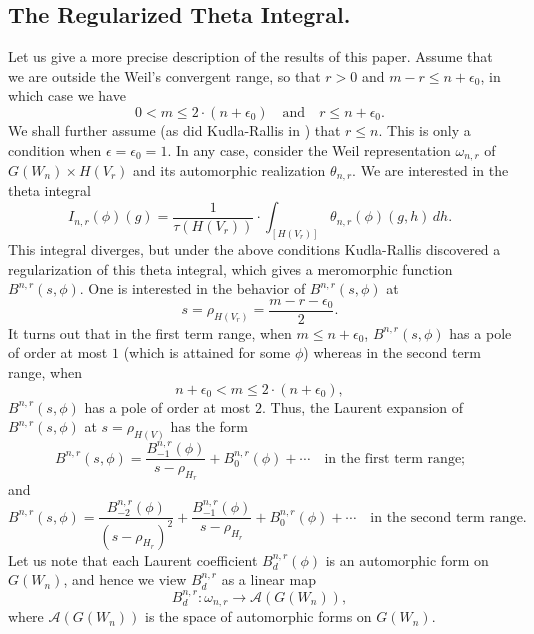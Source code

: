 \documentclass[10pt]{amsart}
\theoremstyle{plain}
\numberwithin{equation}{section}
\begin{document}
\subsection{\bf The Regularized Theta Integral.}
 Let us  give a more precise description of the results of this paper. 
 Assume that we are outside the Weil's convergent range, so that $r >
 0$ and $m-r \leq  n+ \epsilon_0$, in which case we have
 \[  
0 < m  \leq 2 \cdot (n+ \epsilon_0) \quad \text{and} \quad r \leq n+
\epsilon_0. 
\]
 We shall further assume (as did Kudla-Rallis in \cite{KR5}) that $r \leq
 n$. This is only a condition when $\epsilon = \epsilon_ 0 =1$.
In any case, consider the Weil representation $\omega_{n,r}$ of
$G(W_n)\times H(V_r)$ and its automorphic realization
$\theta_{n,r}$. We are interested in the theta integral 
 \[  
I_{n,r}(\phi)(g)    =\frac{1}{\tau(H(V_r))} \cdot  \int_{[H(V_r)]} \theta_{n,r}(\phi)(g,h) \, dh. 
\]
This integral diverges, but under the above conditions
 Kudla-Rallis \cite{KR5} discovered a regularization of this theta
 integral, which gives a meromorphic function $B^{n,r}(s,\phi)$. One
 is interested in the behavior of $B^{n,r}(s,\phi)$ at 
 \[  
s = \rho_{H(V_r)} = \frac{m - r -\epsilon_0}{2}.  
\]
 It turns out that in the first term range, when $m \leq n +
 \epsilon_0$,  $B^{n,r}(s,\phi)$ has a pole of order at most $1$
 (which is attained for some $\phi$) whereas in the second term range,
 when 
 \[ 
n+\epsilon_0 < m \leq 2 \cdot (n+\epsilon_0), 
\]
 $B^{n,r}(s,\phi)$ has a pole of order at most $2$.  Thus, the Laurent
 expansion of $B^{n,r}(s,\phi)$ at $s = \rho_{H(V)}$ has the form
 \[  
B^{n,r}(s, \phi)  =  \frac{B^{n,r}_{-1}(\phi)}{s-\rho_{H_r}} +
B^{n,r}_0(\phi)+\cdots  \quad \text{in the first term range;} 
\]
 and
\[
 B^{n,r}(s, \phi)  =  \frac{B^{n,r}_{-2}(\phi)}{(s-\rho_{H_r})^2} +
   \frac{B^{n,r}_{-1}(\phi)}{s-\rho_{H_r}} +  B^{n,r}_0(\phi)+\cdots
 \quad \text{in the second term range.}  
\]
Let us note that each Laurent coefficient $B_d^{n,r}(\phi)$ is an
automorphic form on $G(W_n)$, and hence we view $B_d^{n,r}$ as a
linear map
\[
B_d^{n,r}:\omega_{n,r}\rightarrow {\mathcal{A}}(G(W_n)),
\]
where ${\mathcal{A}}(G(W_n))$ is the space of automorphic forms on $G(W_n)$.
\vskip 5pt
\end{document}
